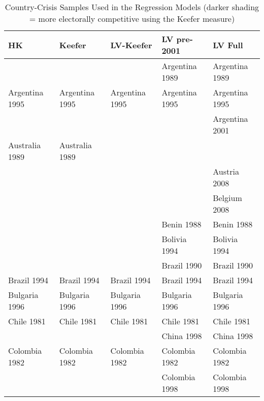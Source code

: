 \begin{table}[ht]
\centering
\caption{Country-Crisis Samples Used in the Regression Models (darker shading = more electorally competitive using the Keefer measure)} 
\label{samplesTable}
{\tiny
\begin{tabular}{lllll}
  \hline
\textbf{HK} & \textbf{Keefer} & \textbf{LV-Keefer} & \textbf{LV pre-2001} & \textbf{LV Full} \\ 
  \hline
 &  &  & Argentina 1989\cellcolor[gray]{0.5} & Argentina 1989\cellcolor[gray]{0.5} \\ 
  Argentina 1995\cellcolor[gray]{0.5} & Argentina 1995\cellcolor[gray]{0.5} & Argentina 1995\cellcolor[gray]{0.5} & Argentina 1995\cellcolor[gray]{0.5} & Argentina 1995\cellcolor[gray]{0.5} \\ 
   &  &  &  & Argentina 2001\cellcolor[gray]{0.5} \\ 
  Australia 1989\cellcolor[gray]{0.5} & Australia 1989\cellcolor[gray]{0.5} &  &  &  \\ 
   &  &  &  & Austria 2008\cellcolor[gray]{0.5} \\ 
   &  &  &  & Belgium 2008\cellcolor[gray]{0.5} \\ 
   &  &  & Benin 1988\cellcolor[gray]{1} & Benin 1988\cellcolor[gray]{1} \\ 
   &  &  & Bolivia 1994\cellcolor[gray]{0.5} & Bolivia 1994\cellcolor[gray]{0.5} \\ 
   &  &  & Brazil 1990\cellcolor[gray]{0.5} & Brazil 1990\cellcolor[gray]{0.5} \\ 
  Brazil 1994\cellcolor[gray]{0.5} & Brazil 1994\cellcolor[gray]{0.5} & Brazil 1994\cellcolor[gray]{0.5} & Brazil 1994\cellcolor[gray]{0.5} & Brazil 1994\cellcolor[gray]{0.5} \\ 
  Bulgaria 1996\cellcolor[gray]{0.5} & Bulgaria 1996\cellcolor[gray]{0.5} & Bulgaria 1996\cellcolor[gray]{0.5} & Bulgaria 1996\cellcolor[gray]{0.5} & Bulgaria 1996\cellcolor[gray]{0.5} \\ 
  Chile 1981\cellcolor[gray]{1} & Chile 1981\cellcolor[gray]{1} & Chile 1981\cellcolor[gray]{1} & Chile 1981\cellcolor[gray]{1} & Chile 1981\cellcolor[gray]{1} \\ 
   &  &  & China 1998\cellcolor[gray]{1} & China 1998\cellcolor[gray]{1} \\ 
  Colombia 1982\cellcolor[gray]{0.5} & Colombia 1982\cellcolor[gray]{0.5} & Colombia 1982\cellcolor[gray]{0.5} & Colombia 1982\cellcolor[gray]{0.5} & Colombia 1982\cellcolor[gray]{0.5} \\ 
   &  &  & Colombia 1998\cellcolor[gray]{0.5} & Colombia 1998\cellcolor[gray]{0.5} \\ 

\end{tabular}}
\end{table}
